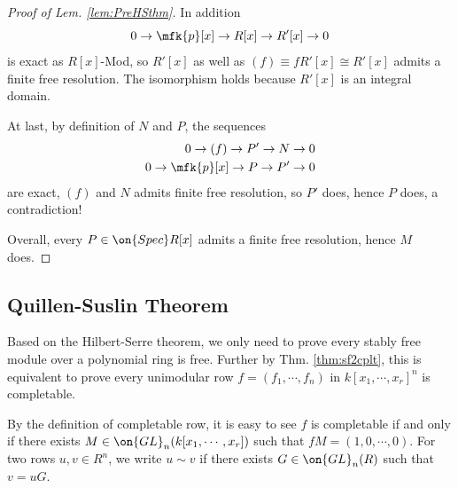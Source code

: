 \begin{proof}[Proof of Lem. \ref{lem:PreHSthm}]
	In addition
	$$
	0\rightarrow\mfk{p}[x]\rightarrow R[x]\rightarrow R'[x]\rightarrow0
	$$
	is exact as $R[x]$-Mod, so $R'[x]$ as well as $(f)\equiv fR'[x]\cong R'[x]$ admits a finite free resolution. The isomorphism holds because $R'[x]$ is an integral domain.
	
	At last, by definition of $N$ and $P$, the sequences
	\begin{equation*}
		\begin{split}
			0\rightarrow(f)\rightarrow P'\rightarrow N\rightarrow0\\
			0\rightarrow\mfk{p}[x]\rightarrow P\rightarrow P'\rightarrow0\\
		\end{split}
	\end{equation*}	
	are exact, $(f)$ and $N$ admits finite free resolution, so $P'$ does, hence $P$ does, a contradiction!
	
	Overall, every $P\in\on{Spec}R[x]$ admits a finite free resolution, hence $M$ does.
\end{proof}
	
\subsection{Quillen-Suslin Theorem}
Based on the Hilbert-Serre theorem, we only need to prove every stably free module over a polynomial ring is free. Further by Thm. \ref{thm:sf2cplt}, this is equivalent to prove every unimodular row $f=(f_1,\cdots,f_n)$ in $k[x_1,\cdots,x_r]^n$ is completable.

By the definition of completable row, it is easy to see $f$ is completable if and only if there exists $M\in\on{GL}_n(k[x_1,\cdots,x_r])$ such that $fM = (1,0,\cdots,0)$. For two rows $u,v\in R^n$, we write $u\sim v$ if there exists $G\in\on{GL}_n(R)$ such that $v=uG$.

